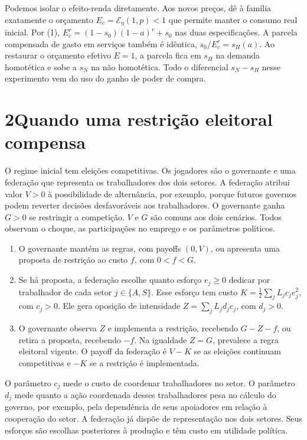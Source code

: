 \documentclass[11pt,a4paper]{article}
\newcommand{\titulo}[1]{\section*{\color{tinta}#1}}
\begin{document}
Podemos isolar o efeito-renda diretamente. Aos novos preços, dê à família exatamente o orçamento \(E_c=\mathcal E_\eta(1,p)<1\) que permite manter o consumo real inicial. Por (1), \(E_c^r=(1-s_0)(1-a)^r+s_0\) nas duas especificações. A parcela compensada de gasto em serviços também é idêntica, \(s_0/E_c^r=s_H(a)\). Ao restaurar o orçamento efetivo \(E=1\), a parcela fica em \(s_H\) na demanda homotética e sobe a \(s_N\) na não homotética. Todo o diferencial \(s_N-s_H\) nesse experimento vem do uso do ganho de poder de compra.

\newpage
\titulo{2\quad Quando uma restrição eleitoral compensa}
O regime inicial tem eleições competitivas. Os jogadores são o governante e uma federação que representa os trabalhadores dos dois setores. A federação atribui valor \(V>0\) à possibilidade de alternância, por exemplo, porque futuros governos podem reverter decisões desfavoráveis aos trabalhadores. O governante ganha \(G>0\) se restringir a competição. \(V\) e \(G\) são comuns aos dois cenários. Todos observam o choque, as participações no emprego e os parâmetros políticos.

\begin{enumerate}\setlength{\itemsep}{2pt}
\item O governante mantém as regras, com payoffs \((0,V)\), ou apresenta uma proposta de restrição ao custo \(f\), com \(0<f<G\).
\item Se há proposta, a federação escolhe quanto esforço \(e_j\geq0\) dedicar por trabalhador de cada setor \(j\in\{A,S\}\). Esse esforço tem custo \(K=\tfrac12\sum_j L_j c_j e_j^2\), com \(c_j>0\). Ele gera oposição de intensidade \(Z=\sum_j L_j d_j e_j\), com \(d_j>0\).
\item O governante observa \(Z\) e implementa a restrição, recebendo \(G-Z-f\), ou retira a proposta, recebendo \(-f\). Na igualdade \(Z=G\), prevalece a regra eleitoral vigente. O payoff da federação é \(V-K\) se as eleições continuam competitivas e \(-K\) se a restrição é implementada.
\end{enumerate}

O parâmetro \(c_j\) mede o custo de coordenar trabalhadores no setor. O parâmetro \(d_j\) mede quanto a ação coordenada desses trabalhadores pesa no cálculo do governo, por exemplo, pela dependência de seus apoiadores em relação à cooperação do setor. A federação já dispõe de representação nos dois setores. Seus esforços são escolhas posteriores à produção e têm custo em utilidade política.
\end{document}
